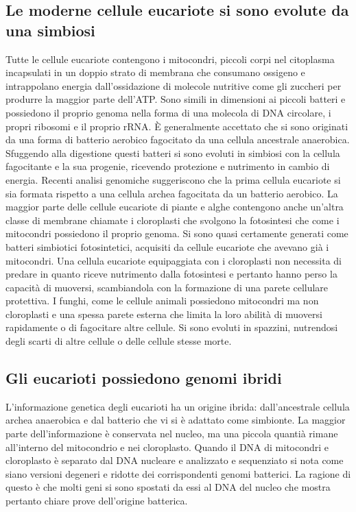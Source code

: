 \subsection{Le moderne cellule eucariote si sono evolute da una simbiosi}
Tutte le cellule eucariote contengono i mitocondri, piccoli corpi nel citoplasma incapsulati in un doppio strato di membrana che consumano ossigeno e intrappolano energia 
dall'ossidazione di molecole nutritive come gli zuccheri per produrre la maggior parte dell'ATP. Sono simili in dimensioni ai piccoli batteri e possiedono il proprio genoma nella forma
di una molecola di DNA circolare, i propri ribosomi e il proprio rRNA. \`E generalmente accettato che si sono originati da una forma di batterio aerobico fagocitato da una cellula
ancestrale anaerobica. Sfuggendo alla digestione questi batteri si sono evoluti in simbiosi con la cellula fagocitante e la sua progenie, ricevendo protezione e nutrimento in cambio di
energia. Recenti analisi genomiche suggeriscono che la prima cellula eucariote si sia formata rispetto a una cellula archea fagocitata da un batterio aerobico. La maggior parte delle
cellule eucariote di piante e alghe contengono anche un'altra classe di membrane chiamate i cloroplasti che svolgono la fotosintesi che come i mitocondri possiedono il proprio genoma.
Si sono quasi certamente generati come batteri simbiotici fotosintetici, acquisiti da cellule eucariote che avevano gi\`a i mitocondri. Una cellula eucariote equipaggiata con i 
cloroplasti non necessita di predare in quanto riceve nutrimento dalla fotosintesi e pertanto hanno perso la capacit\`a di muoversi, scambiandola con la formazione di una parete 
cellulare protettiva. I funghi, come le cellule animali possiedono mitocondri ma non cloroplasti e una spessa parete esterna che limita la loro abilit\`a di muoversi rapidamente o di 
fagocitare altre cellule. Si sono evoluti in spazzini, nutrendosi degli scarti di altre cellule o delle cellule stesse morte.
\subsection{Gli eucarioti possiedono genomi ibridi}
L'informazione genetica degli eucarioti ha un origine ibrida: dall'ancestrale cellula archea anaerobica e dal batterio che vi si \`e adattato come simbionte. La maggior parte 
dell'informazione \`e conservata nel nucleo, ma una piccola quanti\`a rimane all'interno del mitocondrio e nei cloroplasto. Quando il DNA di mitocondri e cloroplasto \`e separato dal 
DNA nucleare e analizzato e sequenziato si nota come siano versioni degeneri e ridotte dei corrispondenti genomi batterici. La ragione di questo \`e che molti geni si sono spostati da
essi al DNA del nucleo che mostra pertanto chiare prove dell'origine batterica.
